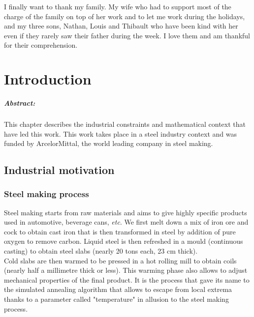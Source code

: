 \documentclass[12pt,a4paper]{report}
\begin{document}
	I finally want to thank my family. My wife who had to support most of the charge of the family on top of her work and to let me work during the holidays, and my three sons, Nathan, Louis and Thibault who have been kind with her even if they rarely saw their father during the week. I love them and am thankful for their comprehension.




\tableofcontents
		  
\chapter{Introduction}
	\paragraph{Abstract:} This chapter describes the industrial constraints and mathematical context that have led this work. This work takes place in a steel industry context and was funded by ArcelorMittal, the world leading company in steel making. 
\section{Industrial motivation}
\subsection{Steel making process}
	Steel making starts from raw materials and aims to give highly specific products used in automotive, beverage cans, {\it etc}.
	We first melt down a mix of iron ore and cock to obtain cast iron that is then transformed in steel by addition of pure oxygen to remove carbon. Liquid steel is then refreshed in a mould (continuous casting) to obtain steel slabs (nearly 20 tons each, 23 cm thick). \\
	
	Cold slabs are then warmed to be pressed in a hot rolling mill to obtain coils (nearly half a  millimetre thick or less). This warming phase also allows to adjust mechanical properties of the final product. It is the process that gave its name to the simulated annealing algorithm that allows to escape from local extrema thanks to a parameter called "temperature" in allusion to the steel making process.  \\
	 
\end{document}
